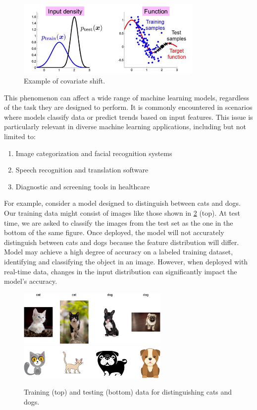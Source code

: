 \begin{figure}[H]
	\centering
	\includegraphics[width=0.8\textwidth]{assets/immagine.png} 
	\caption{Example of covariate shift.}
	\label{fig:covariate-shift}
\end{figure}

This phenomenon can affect a wide range of machine learning models, regardless of the task they are designed to perform. It is commonly encountered in scenarios where models classify data or predict trends based on input features. This issue is particularly relevant in diverse machine learning applications, including but not limited to:
	
	\begin{enumerate}
		\item Image categorization and facial recognition systems
		\item Speech recognition and translation software
		\item Diagnostic and screening tools in healthcare
	\end{enumerate}
	
For example, consider a model designed to distinguish between cats and dogs. Our training data might consist of images like those shown in \cref{fig:cani-gatti} (top). At test time, we are asked to classify the images from the test set as the one in the bottom of the same figure. Once deployed, the model will not accurately distinguish between cats and dogs because the feature distribution will differ. Model may achieve a high degree of accuracy on a labeled training dataset, identifying and classifying the object in an image. However, when deployed with real-time data, changes in the input distribution can significantly impact the model's accuracy.

\begin{figure}[H]
	\centering
	\includegraphics[width=0.65\textwidth]{assets/cat-dog-train.png}
	\includegraphics[width=0.65\textwidth]{assets/cat-dog-test.png} 
	\caption{Training (top) and testing (bottom) data for distinguishing cats and dogs.}
	\label{fig:cani-gatti}
\end{figure}

